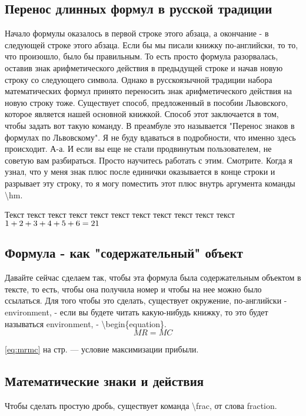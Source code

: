 \documentclass[a4paper,12pt]{article} %
\newcommand*{\hm}[1]{#1\nobreak\discretionary{}
{\hbox{$\mathsurround=0pt #1$}}{}}
\begin{document}
\subsection{Перенос длинных формул в русской традиции}
	Начало формулы оказалось в первой строке
	этого абзаца, а окончание - в следующей строке этого
	абзаца. Если бы мы писали книжку по-английски, то
	то, что произошло, было бы правильным. То есть просто формула разорвалась,
	оставив знак арифметического действия в предыдущей строке и начав новую строку
	со следующего символа. Однако в русскоязычной традиции набора
	математических формул принято переносить знак арифметического
	действия на новую строку тоже.
	Существует способ, предложенный в пособии Львовского, которое является нашей
	основной книжкой. Способ этот заключается в том, чтобы
	задать вот такую команду. В преамбуле это называется "Перенос знаков
	в формулах по Львовскому". Я не буду вдаваться в подробности, что
	именно здесь происходит. А-а. И если вы еще не стали продвинутым
	пользователем, не советую вам разбираться. Просто научитесь работать с этим. Смотрите. Когда я узнал, что у меня знак плюс после
	единички оказывается в конце строки и разрывает эту строку, то я могу поместить
	этот плюс внутрь аргумента команды \textbackslash hm.
	
	Текст текст текст текст текст текст текст текст текст текст текст $1\hm{+}2+3+4+5+6=21$
	
\subsection{Формула - как "содержательный" объект}
Давайте сейчас сделаем так, чтобы эта формула была содержательным объектом в
тексте, то есть, чтобы она получила номер и чтобы
на нее можно было ссылаться. Для того чтобы это сделать, существует окружение, по-английски -
environment, - если вы будете читать какую-нибудь книжку, то это будет называться environment, -
\textbackslash begin\{equation\}.
\begin{equation}\label{eq:mrmc}
MR=MC
\end{equation}

\eqref{eq:mrmc}  на стр. \pageref{eq:mrmc} --- условие максимизации прибыли.

\subsection{Математические знаки и действия}
Чтобы сделать простую дробь, существует
команда \textbackslash frac, от слова fraction.
\end{document}
